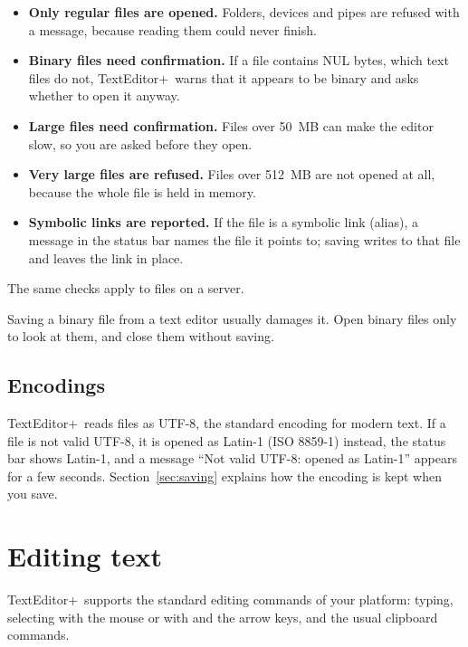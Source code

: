 \documentclass[11pt,a4paper]{article}
\newcommand{\appname}{TextEditor+}
\newcommand{\ui}[1]{\textsf{#1}}
\begin{document}
\begin{itemize}
  \item \textbf{Only regular files are opened.} Folders, devices and pipes are
        refused with a message, because reading them could never finish.
  \item \textbf{Binary files need confirmation.} If a file contains NUL bytes,
        which text files do not, \appname\ warns that it appears to be binary
        and asks whether to open it anyway.
  \item \textbf{Large files need confirmation.} Files over 50~MB can make the
        editor slow, so you are asked before they open.
  \item \textbf{Very large files are refused.} Files over 512~MB are not
        opened at all, because the whole file is held in memory.
  \item \textbf{Symbolic links are reported.} If the file is a symbolic link
        (alias), a message in the status bar names the file it points to;
        saving writes to that file and leaves the link in place.
\end{itemize}

The same checks apply to files on a server.

\begin{caution}
Saving a binary file from a text editor usually damages it. Open binary files
only to look at them, and close them without saving.
\end{caution}

\subsection{Encodings}

\appname\ reads files as UTF-8, the standard encoding for modern text. If a file
is not valid UTF-8, it is opened as Latin-1 (ISO 8859-1) instead, the status bar
shows \ui{Latin-1}, and a message ``Not valid UTF-8: opened as Latin-1'' appears
for a few seconds. Section~\ref{sec:saving} explains how the encoding is kept
when you save.

\section{Editing text}

\appname\ supports the standard editing commands of your platform: typing,
selecting with the mouse or with  and the arrow keys, and the usual
clipboard commands.
\end{document}
